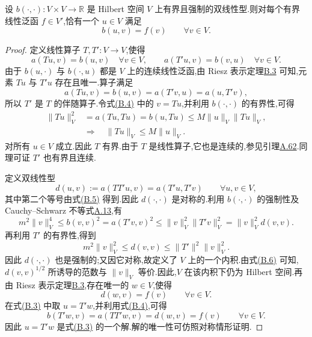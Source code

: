 
\begin{theorem}\label{thm:appendix-b-4}
设 $b(\cdot,\cdot):V\times V\to\mathbb R$ 是 Hilbert 空间 $V$ 上有界且强制的双线性型.则对每个有界线性泛函 $f\in V'$,恰有一个 $u\in V$ 满足
\begin{equation}\label{eq:appendix-b-3}
 b(u,v)=f(v)\qquad \forall v\in V.
\end{equation}
\end{theorem}
\begin{proof}
定义线性算子 $T,T':V\to V$,使得
\begin{equation}\label{eq:appendix-b-4}
 a(Tu,v)=b(u,v)\quad\forall v\in V,\qquad
 a(T'u,v)=b(v,u)\quad\forall v\in V.
\end{equation}
由于 $b(u,\cdot)$ 与 $b(\cdot,u)$ 都是 $V$ 上的连续线性泛函,由 Riesz 表示定理\hyperref[thm:appendix-b-3]{B.3} 可知,元素 $Tu$ 与 $T'u$ 存在且唯一.算子满足
\begin{equation}\label{eq:appendix-b-5}
 a(Tu,v)=b(u,v)=a(T'v,u)=a(u,T'v),
\end{equation}
所以 $T'$ 是 $T$ 的伴随算子.令式\hyperref[eq:appendix-b-4]{(B.4)} 中的 $v=Tu$,并利用 $b(\cdot,\cdot)$ 的有界性,可得
\[
\begin{aligned}
 \|Tu\|_V^2&=a(Tu,Tu)=b(u,Tu)
 \le M\|u\|_V\|Tu\|_V,\\
 &\Longrightarrow\quad \|Tu\|_V\le M\|u\|_V.
\end{aligned}
\]
对所有 $u\in V$ 成立.因此 $T$ 有界.由于 $T$ 是线性算子,它也是连续的,参见引理\hyperref[lem:appendix-a-62]{A.62}.同理可证 $T'$ 也有界且连续.

定义双线性型
\[
 d(u,v):=a(TT'u,v)=a(T'u,T'v)\qquad \forall u,v\in V,
\]
其中第二个等号由式\hyperref[eq:appendix-b-5]{(B.5)} 得到.因此 $d(\cdot,\cdot)$ 是对称的.利用 $b(\cdot,\cdot)$ 的强制性及 Cauchy--Schwarz 不等式\hyperref[lem:appendix-a-13]{A.13},有
\[
 m^2\|v\|_V^4
 \le b(v,v)^2
 =a(T'v,v)^2
 \le \|v\|_V^2\|T'v\|_V^2
 =\|v\|_V^2d(v,v).
\]
再利用 $T'$ 的有界性,得到
\begin{equation}\label{eq:appendix-b-6}
 m^2\|v\|_V^2\le d(v,v)\le \|T'\|^2\|v\|_V^2.
\end{equation}
因此 $d(\cdot,\cdot)$ 也是强制的;又因它对称,故定义了 $V$ 上的一个内积.由式\hyperref[eq:appendix-b-6]{(B.6)} 可知,$d(v,v)^{1/2}$ 所诱导的范数与 $\|v\|_V$ 等价.因此,$V$ 在该内积下仍为 Hilbert 空间.再由 Riesz 表示定理\hyperref[thm:appendix-b-3]{B.3},存在唯一的 $w\in V$,使得
\[
 d(w,v)=f(v)\qquad \forall v\in V.
\]
在式\hyperref[eq:appendix-b-3]{(B.3)} 中取 $u=T'w$,并利用式\hyperref[eq:appendix-b-4]{(B.4)},可得
\[
 b(T'w,v)=a(TT'w,v)=d(w,v)=f(v)\qquad \forall v\in V.
\]
因此 $u=T'w$ 是式\hyperref[eq:appendix-b-3]{(B.3)} 的一个解.解的唯一性可仿照对称情形证明.
\end{proof}

